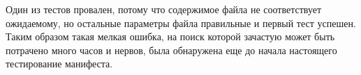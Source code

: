 Один из тестов провален, потому что содержимое файла не соответствует ожидаемому, но остальные параметры файла правильные и первый тест успешен. Таким образом такая мелкая ошибка, на поиск которой зачастую может быть потрачено много часов и нервов, была обнаружена еще до начала настоящего тестирование манифеста.
